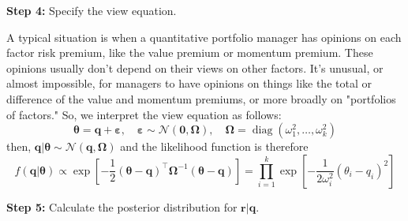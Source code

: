 \documentclass[13pt]{article}
\theoremstyle{definition}
\theoremstyle{remark}
\begin{document}
{\color{C6}\textbf{Step 4:} Specify the view equation.}\label{seee:Specify the view equation }

A typical situation is when a quantitative portfolio manager has opinions on each factor risk premium, like the value premium or momentum premium. These opinions usually don't depend on their views on other factors. It's unusual, or almost impossible, for managers to have opinions on things like the total or difference of the value and momentum premiums, or more broadly on "portfolios of factors." So, we interpret the view equation as follows:
\[
\bm{\theta} = \bm{q} +\bm{\varepsilon}, \quad \bm{\varepsilon} \sim \mathcal{N}(\bm{0}, \mathbf{\Omega}), \quad \mathbf{\Omega}=\operatorname{diag}\left(\omega_1^2, \ldots, \omega_k^2\right)
\]
then, $\boldsymbol{q} | \boldsymbol{\theta} \sim \mathcal{N}(\bm{q}, \mathbf{\Omega})$ and the likelihood function is therefore
$$
f(\boldsymbol{q} | \boldsymbol{\theta})\propto\exp\left[-\frac{1}{2}(\bm{\theta}-\bm{q})^\top\mathbf{\Omega}^{-1}(\bm{\theta}-\bm{q})\right]=\prod_{i=1}^k \exp \left[-\frac{1}{2 \omega_i^2}\left(\theta_i-q_i\right)^2\right]
$$

{\color{C6}\textbf{Step 5:} Calculate the posterior distribution for $\bm{r}|\bm{q}$.}
\end{document}
